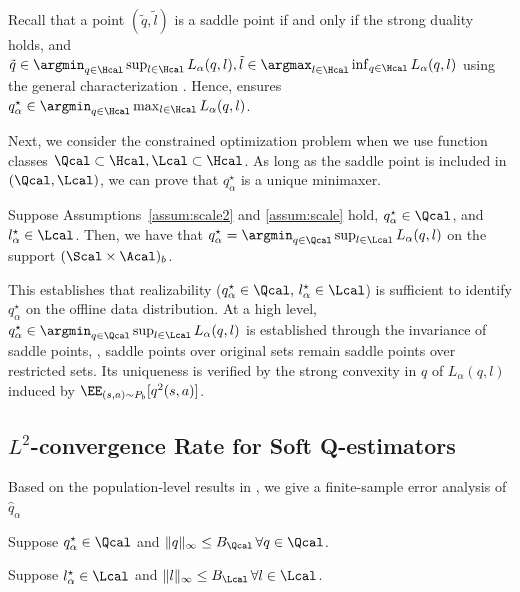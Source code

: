 Recall that a point $(\tilde q,\tilde l)$ is a saddle point if and only if the strong duality holds, and $\tilde q \in \argmin_{q \in \Hcal}\sup_{l \in \Hcal}L_{\alpha}(q,l),\tilde l \in \argmax_{l \in \Hcal}\inf_{q\in \Hcal}L_{\alpha}(q,l)$ using the general characterization \citep{bertsekas2009convex}. Hence,  ensures $q^{\star}_{\alpha} \in  \argmin_{q \in \Hcal}\max_{l \in \Hcal}L_{\alpha}(q,l)$. 

Next, we consider the constrained optimization problem when we use function classes $\Qcal \subset \Hcal, \Lcal \subset \Hcal$. As long as the saddle point is included in $(\Qcal,\Lcal)$, we can prove that $q^{\star}_{\alpha}$ is a unique minimaxer.  %

\begin{lemma}\label{lem:saddle2}
Suppose Assumptions~\ref{assum:scale2} and \ref{assum:scale} hold, $q^{\star}_{\alpha} \in \Qcal$, and $l^{\star}_{\alpha}\in \Lcal$. Then, we have that
$q^{\star}_{\alpha} =  \argmin_{q \in \Qcal}\sup_{l \in \Lcal}L_{\alpha}(q,l)$ on the support $(\Scal \times \Acal)_b$. 
\end{lemma}

This establishes that realizability ($q^{\star}_{\alpha} \in \Qcal,\,l^{\star}_{\alpha}\in \Lcal$)
is sufficient to identify $q^{\star}_{\alpha}$ on the offline data distribution. At a high level, $q^{\star}_{\alpha} \in  \argmin_{q \in \Qcal}\sup_{l \in \Lcal}L_{\alpha}(q,l)$ is established through the invariance of saddle points, \ie, saddle points over original sets remain saddle points over restricted sets. Its uniqueness is verified by the strong convexity in $q$ of $L_{\alpha}(q,l)$ induced by $\EE_{(s,a)\sim P_b}[q^2(s,a)]$. 


\subsection{$L^2$-convergence Rate for   
Soft Q-estimators}\label{subsec:finite}


Based on the population-level results in , we give a finite-sample error analysis of $\hat q_\alpha$  
\begin{assum}\label{assum:softmax}
   Suppose $q^{\star}_{\alpha} \in \Qcal$ and $\|q\|_{\infty}\leq B_{\Qcal}\,\forall q\in \Qcal$.
\end{assum}

\begin{assum}\label{assum:largrange}
Suppose $l^{\star}_{\alpha} \in \Lcal$ and $\|l\|_{\infty}\leq B_{\Lcal}\,\forall l \in \Lcal$.
\end{assum}

